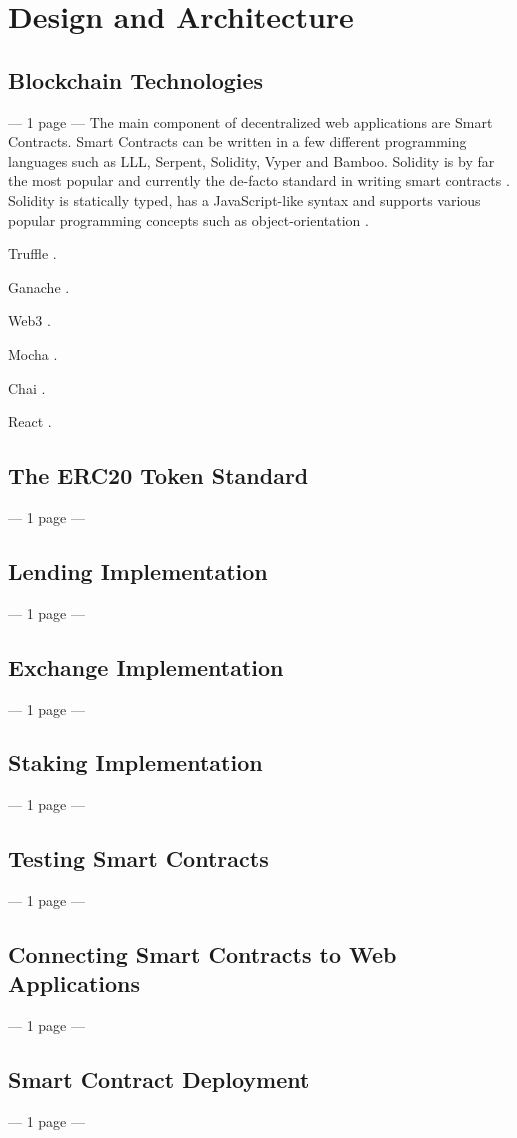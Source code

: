 \chapter{Design and Architecture}

\label{cha:DesignArchitecture}

\section{Blockchain Technologies}
--- 1 page ---
The main component of decentralized web applications are Smart Contracts. Smart Contracts can be written in a few different programming languages such as LLL, Serpent, Solidity, Vyper and Bamboo. Solidity is by far the most popular and currently the de-facto standard in writing smart contracts \cite{AntonopoulosWood2018}. Solidity is statically typed, has a JavaScript-like syntax and supports various popular programming concepts such as object-orientation \cite{SolidityDocumentation}\cite{Solidity}.

Truffle \cite{Truffle}.

Ganache \cite{Ganache}.

Web3 \cite{Web3}.

Mocha \cite{Mocha}.

Chai \cite{Chai}.

React \cite{React}.

\section{The ERC20 Token Standard}
--- 1 page ---

\section{Lending Implementation}
--- 1 page ---

\section{Exchange Implementation}
--- 1 page ---

\section{Staking Implementation}
--- 1 page ---

\section{Testing Smart Contracts}
--- 1 page ---

\section{Connecting Smart Contracts to Web Applications}
--- 1 page ---

\section{Smart Contract Deployment}
--- 1 page ---
